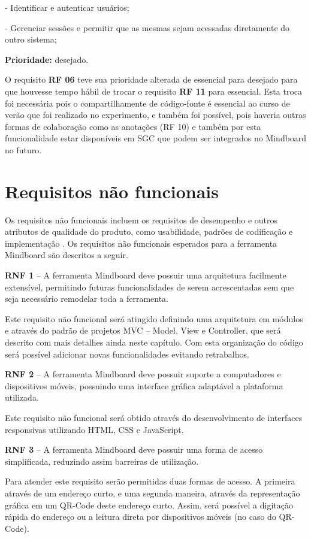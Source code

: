 - Identificar e autenticar usuários;

- Gerenciar sessões e permitir que as mesmas sejam acessadas diretamente do outro sistema;

\textbf{Prioridade:} desejado.

O requisito \textbf{RF 06} teve sua prioridade alterada de essencial para desejado para que houvesse tempo hábil de trocar o requisito \textbf{RF 11} para essencial. Esta troca foi necessária pois o compartilhamente de código-fonte é essencial ao curso de verão que foi realizado no experimento, e também foi possível, pois haveria outras formas de colaboração como as anotações (RF 10)  e também por esta funcionalidade estar disponíveis em SGC que podem ser integrados no Mindboard no futuro.

\section{Requisitos não funcionais}

Os requisitos não funcionais incluem os requisitos de desempenho e outros atributos de qualidade do produto, como usabilidade, padrões de codificação e implementação \cite{padua05}. Os requisitos não funcionais esperados para a ferramenta Mindboard são descritos a seguir.

\textbf{RNF 1} – A ferramenta Mindboard deve possuir uma arquitetura facilmente extensível, permitindo futuras funcionalidades de serem acrescentadas sem que seja necessário remodelar toda a ferramenta.

Este requisito não funcional será atingido definindo uma arquitetura em módulos e através do padrão de projetos MVC – Model, View e Controller, que será descrito com mais detalhes ainda neste capítulo. Com esta organização do código será possível adicionar novas funcionalidades evitando retrabalhos.


\textbf{RNF 2} – A ferramenta Mindboard deve possuir suporte a computadores e dispositivos móveis, possuindo uma interface gráfica adaptável a plataforma utilizada.

Este requisito não funcional será obtido através do desenvolvimento de interfaces responsivas utilizando HTML, CSS e JavaScript.

\textbf{RNF 3} – A ferramenta Mindboard deve possuir uma forma de acesso simplificada, reduzindo assim barreiras de utilização. 

Para atender este requisito serão permitidas duas formas de acesso. A primeira através de um endereço curto, e uma segunda maneira, através da representação gráfica em um QR-Code deste endereço curto. Assim, será possível a digitação rápida do endereço ou a leitura direta por dispositivos móveis (no caso do QR-Code).

